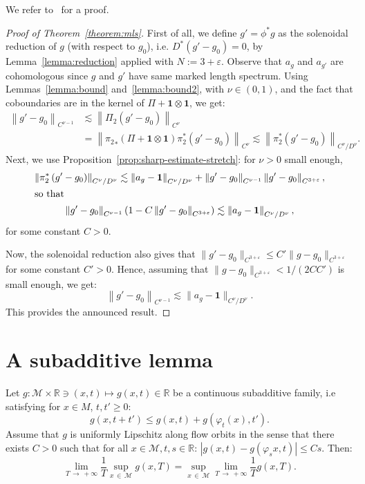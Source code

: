 \documentclass[AHL,Unicode,longabstracts,published]{cedram}
\newcommand{\R}{\mathbb{R}}
\newcommand{\bfun}{\mathbf{1}}
\newcommand{\eps}{\varepsilon}
\newcommand{\M}{\mathcal{M}}
\begin{document}
We refer to~\cite{Ebin-68, Guillarmou-Lefeuvre-18} for a proof.

\begin{proof}[Proof of Theorem~\ref{theorem:mls}]
First of all, we define $g' = \phi^*g$ as the solenoidal reduction of $g$ (with respect to $g_0$), i.e. $D^*(g'-g_0) = 0$, by Lemma~\ref{lemma:reduction} applied with $N := 3+\eps$. Observe that $a_g$ and $a_{g'}$ are cohomologous since $g$ and $g'$ have same marked length spectrum. Using Lemmas~\ref{lemma:bound} and~\ref{lemma:bound2}, with $\nu\in (0,1)$, and the fact that coboundaries are in the kernel of $\Pi + \bfun\otimes\bfun$, we get:
\begin{align*}
\left\|g'-g_0\right\|_{C^{\nu-1}} &\lesssim \left\|\Pi_2(g'-g_0)\right\|_{C^{\nu}}\\
&= \left\|{\pi_2}_* (\Pi + \bfun\otimes\bfun)\pi_2^\ast \left(g'-g_0\right)\right\|_{C^\nu} \lesssim \left\| \pi_2^\ast\left(g'-g_0\right) \right\|_{C^\nu/D^\nu}.
\end{align*}
Next, we use Proposition~\ref{prop:sharp-estimate-stretch}: for $\nu>0$ small enough,
\begin{gather*}
\left\| \pi_2^\ast\left(g'-g_0\right)\right\|_{C^\nu/D^\nu} \lesssim \left\| a_g- \bfun\right\|_{C^\nu/D^\nu} + \left\|g'-g_0\right\|_{C^{\nu-1}}\left\|g'-g_0\right\|_{C^{3+\eps}},
\\
\intertext{so that}
\left\|g'-g_0\right\|_{C^{\nu-1}} \left(1- C \left\|g'-g_0\right\|_{C^{3+\eps}}\right) \lesssim \left\| a_g- \bfun\right\|_{C^\nu/D^\nu},
\end{gather*}
for some constant $C > 0$.

Now, the solenoidal reduction also gives that $\|g'-g_0\|_{C^{3+\eps}} \leq C' \|g-g_0\|_{C^{3+\eps}}$ for some constant $C' > 0$. Hence, assuming that $\|g-g_0\|_{C^{3+ \eps}} < 1/(2CC')$ is small enough, we get:
\[
\left\|g'-g_0\right\|_{C^{\nu-1}} \lesssim \|a_g - \bfun\|_{C^\nu/D^{\nu}}.
\]
This provides the announced result.
\end{proof}



\appendix



\section{A subadditive lemma}


\begin{lemm}\label{lemma:sub}
Let $g: \M \times \R \ni (x,t) \mapsto g(x,t) \in \R$ be a continuous subadditive family, i.e satisfying for $x\in M$, $t,t'\geq 0$:
\[
g(x, t+ t') \leq g(x,t)+g(\varphi_t(x), t').
\]
Assume that $g$ is uniformly Lipschitz along flow orbits in the sense that there exists $C >0$ such that for all $x \in \M, t,s \in \R$: $|g(x,t)-g(\varphi_s x,t)| \leq Cs$. Then:
\[
\lim_{T\,\rightarrow\,+\infty} \frac{1}{T} \sup_{x\,\in\,\M} g(x,T) = \sup_{x\,\in\,\M} \lim_{T\,\rightarrow\,+\infty} \frac{1}{T} g(x,T).
\]
\end{lemm}
\end{document}
